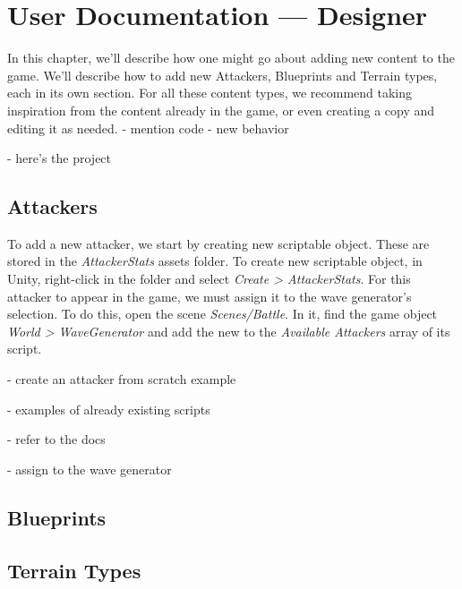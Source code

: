 \chapter{User Documentation --- Designer}

In this chapter, we'll describe how one might go about adding new content to the game.
We'll describe how to add new Attackers, Blueprints and Terrain types, each in its own section.
For all these content types, we recommend taking inspiration from the content already in the game, or even creating a copy and editing it as needed.
- mention code - new behavior

- here's the project

\section{Attackers}

To add a new attacker, we start by creating new  scriptable object.
These are stored in the \emph{AttackerStats} assets folder.
To create new  scriptable object, in Unity, right-click in the folder and select \emph{Create > AttackerStats}.
For this attacker to appear in the game, we must assign it to the wave generator's selection.
To do this, open the scene \emph{Scenes/Battle}.
In it, find the game object \emph{World > WaveGenerator} and add the new  to the \emph{Available Attackers} array of its  script.

- create an attacker from scratch example

- examples of already existing scripts

- refer to the docs

- assign to the wave generator

\section{Blueprints}

\section{Terrain Types}\label{sec:docs-terrain-type}